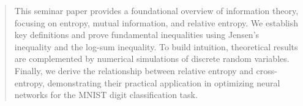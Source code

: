 \begin{abstract}
        This seminar paper provides a foundational overview of information theory, focusing on entropy, mutual information, and relative entropy.
        We establish key definitions and prove fundamental inequalities using Jensen's inequality and the log-sum inequality.
        To build intuition, theoretical results are complemented by numerical simulations of discrete random variables.
        Finally, we derive the relationship between relative entropy and cross-entropy, demonstrating their practical application in optimizing neural networks for the MNIST digit classification task.
\end{abstract}
